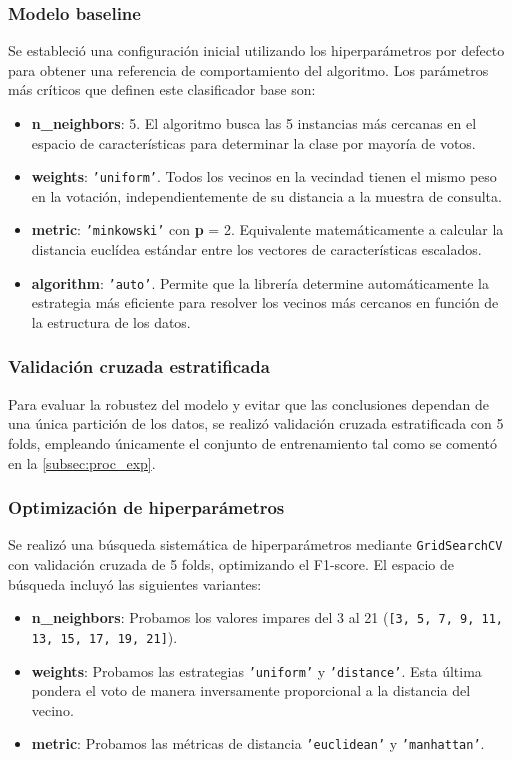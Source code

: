 \subsubsection*{Modelo baseline}

Se estableció una configuración inicial utilizando los hiperparámetros por defecto para obtener una referencia de comportamiento del algoritmo. Los parámetros más críticos que definen este clasificador base son:

\begin{itemize}
	\item \textbf{n\_neighbors}: 5. El algoritmo busca las 5 instancias más cercanas en el espacio de características para determinar la clase por mayoría de votos.
	\item \textbf{weights}: \texttt{'uniform'}. Todos los vecinos en la vecindad tienen el mismo peso en la votación, independientemente de su distancia a la muestra de consulta.
	\item \textbf{metric}: \texttt{'minkowski'} con \textbf{p} = 2. Equivalente matemáticamente a calcular la distancia euclídea estándar entre los vectores de características escalados.
	\item \textbf{algorithm}: \texttt{'auto'}. Permite que la librería determine automáticamente la estrategia más eficiente para resolver los vecinos más cercanos en función de la estructura de los datos.
\end{itemize}

\subsubsection*{Validación cruzada estratificada}

Para evaluar la robustez del modelo y evitar que las conclusiones dependan de una única partición de los datos, se realizó validación cruzada estratificada con 5 folds, empleando únicamente el conjunto de entrenamiento tal como se comentó en la \autoref{subsec:proc_exp}.

\subsubsection*{Optimización de hiperparámetros}

Se realizó una búsqueda sistemática de hiperparámetros mediante \texttt{GridSearchCV} con validación cruzada de 5 folds, optimizando el F1-score. El espacio de búsqueda incluyó las siguientes variantes:

\begin{itemize}
	\item \textbf{n\_neighbors}: Probamos los valores impares del 3 al 21 (\texttt{[3, 5, 7, 9, 11, 13, 15, 17, 19, 21]}).
	\item \textbf{weights}: Probamos las estrategias \texttt{'uniform'} y \texttt{'distance'}. Esta última pondera el voto de manera inversamente proporcional a la distancia del vecino.
	\item \textbf{metric}: Probamos las métricas de distancia \texttt{'euclidean'} y \texttt{'manhattan'}.
\end{itemize}